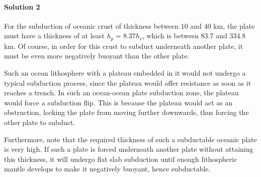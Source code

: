 \documentclass[10pt]{article}
\begin{document}
        \paragraph{Solution 2} For the subduction of oceanic crust of thickness between $10$ and $40$ km, the plate must have a thickness
        of at least $h_p = 8.37 h_c$, which is between 83.7 and 334.8 km.
        Of course, in order for this crust to subduct underneath another plate, it must be even more negatively buoyant than the other plate.

        Such an ocean lithosphere with a plateau embedded in it would not undergo a typical subduction process, since the plateau would
        offer resistance as soon as it reaches a trench. In such an ocean-ocean plate subduction zone, the plateau would force a subduction flip.
        This is because the plateau would act as an obstruction, locking the plate from moving further downwards, thus forcing the other plate
        to subduct.

        Furthermore, note that the required thickness of such a subductable oceanic plate is very high. If such a plate is forced
        underneath another plate without attaining this thickness, it will undergo flat slab subduction until enough lithospheric mantle
        develops to make it negatively buoyant, hence subductable.
        
\end{document}
